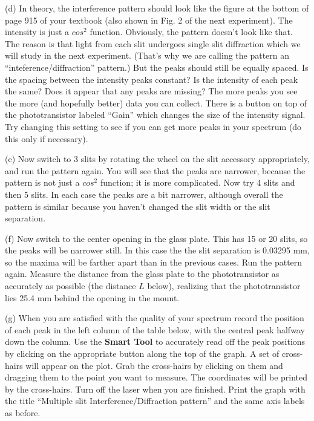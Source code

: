 \newpage

(d) In theory, the interference pattern should look like the figure at the 
bottom of page 915 of your textbook (also shown in Fig. 2 of the next 
experiment). The intensity is just a $cos^2$ function. Obviously, the pattern 
doesn't look like that. The reason is that light from each slit undergoes 
single slit diffraction which we will study in the next experiment. (That's 
why we are calling the pattern an ``inteference/diffraction'' pattern.) 
But the peaks should still be equally spaced. 
Is the spacing between the intensity peaks constant? Is the intensity
of each peak the same? Does it appear that any peaks are missing?
The more peaks you see the more (and hopefully better) data you can collect.
There is a button on top of the phototransistor labeled ``Gain'' which changes
the size of the intensity signal. Try changing this setting to see if you can 
get more peaks in your spectrum (do this only if necessary).
\vspace{15mm}

(e) Now switch to 3 slits by rotating the wheel on the slit accessory 
appropriately, and run the pattern again. You will see that the peaks are 
narrower, because the pattern is not just a $cos^2$ function; it is more 
complicated. Now try 4 slits and then 5 slits. In each case the peaks are a bit 
narrower, although overall the pattern is similar because you haven't changed 
the slit width or the slit separation. 

(f) Now switch to the center opening in the glass plate. This has 15 or 20 
slits, so the peaks will be narrower still. In this case the the slit 
separation is 0.03295 mm, so the maxima will be farther apart than in the 
previous cases. Run the pattern again. Measure the distance from the glass plate
 to the phototransistor as accurately as possible (the distance $L$ below), 
realizing that the phototransistor lies 25.4 mm behind the opening in the mount.

(g) When you are satisfied with the quality of your spectrum record the 
position of each peak in the left column of the table below, with the central 
peak halfway down the column. Use the {\bf Smart Tool} to accurately read off 
the peak positions by clicking on the appropriate button along the top of the 
graph. A set of cross-hairs will appear on the plot. Grab the cross-hairs by 
clicking on them and dragging them to the point you want to measure.
The coordinates will be printed by the cross-hairs.
Turn off the laser when you are finished. Print the graph with the title 
``Multiple slit Interference/Diffraction pattern'' and the same axis labels as 
before.

